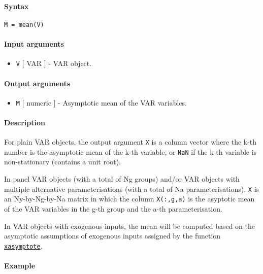 


	\paragraph{Syntax}

\begin{verbatim}
M = mean(V)
\end{verbatim}

\paragraph{Input arguments}

\begin{itemize}
\itemsep1pt\parskip0pt
\item
  \texttt{V} {[} VAR {]} - VAR object.
\end{itemize}

\paragraph{Output arguments}

\begin{itemize}
\itemsep1pt\parskip0pt
\item
  \texttt{M} {[} numeric {]} - Asymptotic mean of the VAR variables.
\end{itemize}

\paragraph{Description}

For plain VAR objects, the output argument \texttt{X} is a column vector
where the k-th number is the asymptotic mean of the k-th variable, or
\texttt{NaN} if the k-th variable is non-stationary (contains a unit
root).

In panel VAR objects (with a total of Ng groups) and/or VAR objects with
multiple alternative parameterisations (with a total of Na
parameterisations), \texttt{X} is an Ny-by-Ng-by-Na matrix in which the
column \texttt{X(:,g,a)} is the asyptotic mean of the VAR variables in
the g-th group and the a-th parameterisation.

In VAR objects with exogenous inputs, the mean will be computed based on
the asymptotic assumptions of exogenous inputs assigned by the function
\href{VAR/xasymptote}{\texttt{xasymptote}}.

\paragraph{Example}


